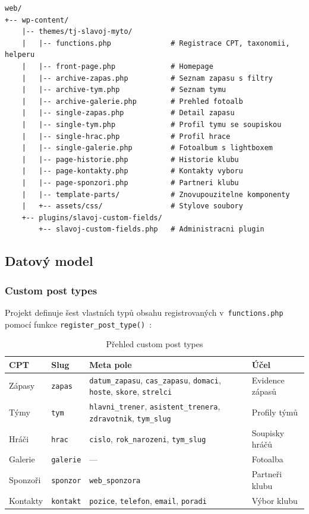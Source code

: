 \documentclass[12pt,a4paper]{article}
\begin{document}
\begin{lstlisting}
web/
+-- wp-content/
    |-- themes/tj-slavoj-myto/
    |   |-- functions.php              # Registrace CPT, taxonomii, helperu
    |   |-- front-page.php             # Homepage
    |   |-- archive-zapas.php          # Seznam zapasu s filtry
    |   |-- archive-tym.php            # Seznam tymu
    |   |-- archive-galerie.php        # Prehled fotoalb
    |   |-- single-zapas.php           # Detail zapasu
    |   |-- single-tym.php             # Profil tymu se soupiskou
    |   |-- single-hrac.php            # Profil hrace
    |   |-- single-galerie.php         # Fotoalbum s lightboxem
    |   |-- page-historie.php          # Historie klubu
    |   |-- page-kontakty.php          # Kontakty vyboru
    |   |-- page-sponzori.php          # Partneri klubu
    |   |-- template-parts/            # Znovupouzitelne komponenty
    |   +-- assets/css/                # Stylove soubory
    +-- plugins/slavoj-custom-fields/
        +-- slavoj-custom-fields.php   # Administracni plugin
\end{lstlisting}

\subsection{Datový model}

\subsubsection{Custom post types}

Projekt definuje šest vlastních typů obsahu registrovaných v~\texttt{functions.php} pomocí funkce \texttt{register\_post\_type()}~\cite{wpdev}:

\begin{table}[H]
\centering
\small
\begin{tabularx}{\textwidth}{l l X l}
\toprule
\textbf{CPT} & \textbf{Slug} & \textbf{Meta pole} & \textbf{Účel} \\
\midrule
Zápasy & \texttt{zapas} & \texttt{datum\_zapasu}, \texttt{cas\_zapasu}, \texttt{domaci}, \texttt{hoste}, \texttt{skore}, \texttt{strelci} & Evidence zápasů \\
Týmy & \texttt{tym} & \texttt{hlavni\_trener}, \texttt{asistent\_trenera}, \texttt{zdravotnik}, \texttt{tym\_slug} & Profily týmů \\
Hráči & \texttt{hrac} & \texttt{cislo}, \texttt{rok\_narozeni}, \texttt{tym\_slug} & Soupisky hráčů \\
Galerie & \texttt{galerie} & --- & Fotoalba \\
Sponzoři & \texttt{sponzor} & \texttt{web\_sponzora} & Partneři klubu \\
Kontakty & \texttt{kontakt} & \texttt{pozice}, \texttt{telefon}, \texttt{email}, \texttt{poradi} & Výbor klubu \\
\bottomrule
\end{tabularx}
\caption{Přehled custom post types}
\end{table}
\end{document}
